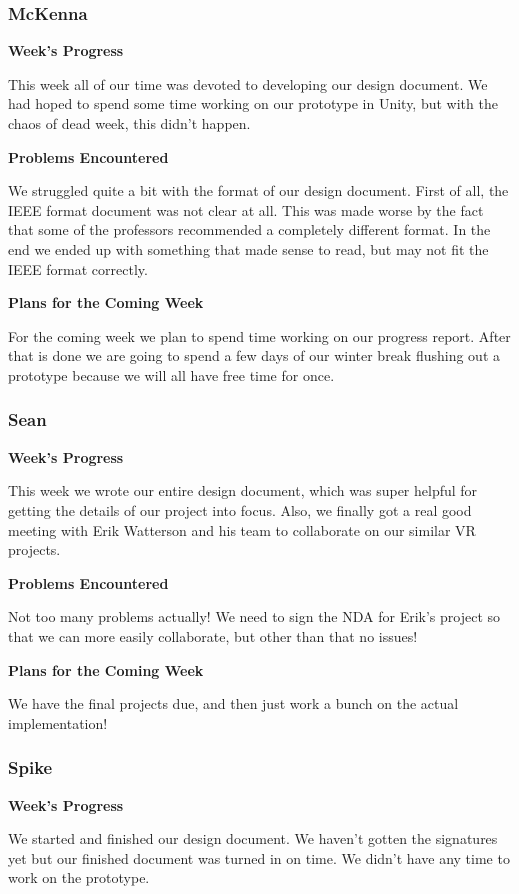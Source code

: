 \documentclass[10pt,journal,compsoc,onecolumn, draftclsnofoot]{IEEEtran}
\begin{document}
\subsubsection{McKenna}
\noindent \textbf{Week's Progress}

This week all of our time was devoted to developing our design document. We had hoped to spend some time working on our prototype in Unity, but with the chaos of dead week, this didn't happen.

\noindent \textbf{Problems Encountered}

We struggled quite a bit with the format of our design document. First of all, the IEEE format document was not clear at all. This was made worse by the fact that some of the professors recommended a completely different format. In the end we ended up with something that made sense to read, but may not fit the IEEE format correctly.

\noindent \textbf{Plans for the Coming Week}

For the coming week we plan to spend time working on our progress report. After that is done we are going to spend a few days of our winter break flushing out a prototype because we will all have free time for once.

\subsubsection{Sean}
\noindent \textbf{Week's Progress}

This week we wrote our entire design document, which was super helpful for getting the details of our project into focus. Also, we finally got a real good meeting with Erik Watterson and his team to collaborate on our similar VR projects.

\noindent \textbf{Problems Encountered}

Not too many problems actually! We need to sign the NDA for Erik's project so that we can more easily collaborate, but other than that no issues!

\noindent \textbf{Plans for the Coming Week}

We have the final projects due, and then just work a bunch on the actual implementation!

\subsubsection{Spike}
\noindent \textbf{Week's Progress}

We started and finished our design document. We haven't gotten the signatures yet but our finished document was turned in on time. We didn't have any time to work on the prototype.
\end{document}
